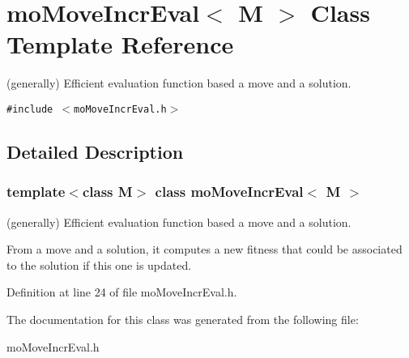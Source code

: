 \section{moMoveIncrEval$<$ M $>$ Class Template Reference}
\label{classmo_move_incr_eval}
(generally) Efficient evaluation function based a move and a solution.  


{\tt \#include $<$moMoveIncrEval.h$>$}



\subsection{Detailed Description}
\subsubsection*{template$<$class M$>$ class moMoveIncrEval$<$ M $>$}

(generally) Efficient evaluation function based a move and a solution. 

From a move and a solution, it computes a new fitness that could be associated to the solution if this one is updated. 



Definition at line 24 of file moMoveIncrEval.h.

The documentation for this class was generated from the following file:\begin{CompactItemize}
\item 
moMoveIncrEval.h\end{CompactItemize}
